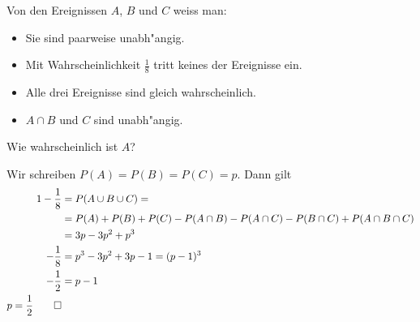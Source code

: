 Von den Ereignissen $A$, $B$ und $C$ weiss man:
\begin{itemize}
\item Sie sind paarweise unabh"angig.
\item Mit Wahrscheinlichkeit $\frac18$ tritt keines der
Ereignisse ein.
\item Alle drei Ereignisse sind gleich wahrscheinlich.
\item $A\cap B$ und $C$ sind unabh"angig.
\end{itemize}
Wie wahrscheinlich ist $A$?

\begin{loesung}
Wir schreiben $P(A)=P(B)=P(C)=p$. Dann gilt
\begin{align*}
1-\frac18&=
P(A\cup B\cup C)=
\\
&=P(A)+P(B)+P(C) -P(A\cap B)-P(A\cap C)-P(B\cap C)+P(A\cap B\cap C)
\\
&=3p-3p^2+p^3
\\
-\frac18&=p^3-3p^2+3p-1=(p-1)^3
\\
-\frac12&=p-1\\
p=\frac12
\qedhere
\end{align*}
\end{loesung}

